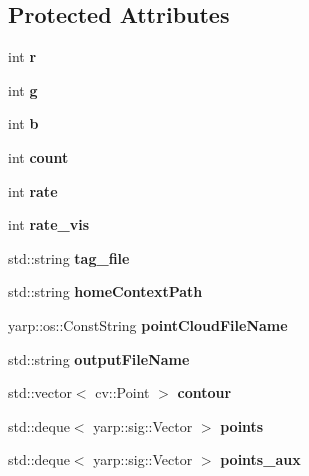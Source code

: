 \subsection*{Protected Attributes}
\begin{DoxyCompactItemize}
\item 
int {\bfseries r}\label{classSuperqModule_ada2b94883ea2a69f9fab8cb045a5a138}

\item 
int {\bfseries g}\label{classSuperqModule_a1d40ba1a934cd176b0365116597814da}

\item 
int {\bfseries b}\label{classSuperqModule_a048daff404a4f8d8dd83072f5e7675cd}

\item 
int {\bfseries count}\label{classSuperqModule_a4fbfa7613a6f89c61454b61acf288b9f}

\item 
int {\bfseries rate}\label{classSuperqModule_aa778e1c9f9b6627b72bafe1c45e097b9}

\item 
int {\bfseries rate\-\_\-vis}\label{classSuperqModule_ad0dab1b5c69a32f877eac1ca745a0cbc}

\item 
std\-::string {\bfseries tag\-\_\-file}\label{classSuperqModule_a06b5f43aeaa26b5ca5961670f8883ab4}

\item 
std\-::string {\bfseries home\-Context\-Path}\label{classSuperqModule_aa767064e88d01bc7cd8fb2038c63e150}

\item 
yarp\-::os\-::\-Const\-String {\bfseries point\-Cloud\-File\-Name}\label{classSuperqModule_aa719adf35eb593b75e0f0930aa18a4f7}

\item 
std\-::string {\bfseries output\-File\-Name}\label{classSuperqModule_aac8cd7786df2bc4aeb0f7290807c4c49}

\item 
std\-::vector$<$ cv\-::\-Point $>$ {\bfseries contour}\label{classSuperqModule_a2a3cbd0eb9042671dbbc457f5cb25c29}

\item 
std\-::deque$<$ yarp\-::sig\-::\-Vector $>$ {\bfseries points}\label{classSuperqModule_a9d894dfd7e6564ee41a98619c8178584}

\item 
std\-::deque$<$ yarp\-::sig\-::\-Vector $>$ {\bfseries points\-\_\-aux}\label{classSuperqModule_a94cb68f67f8c51a188e12db5fad27565}


\end{DoxyCompactItemize}
